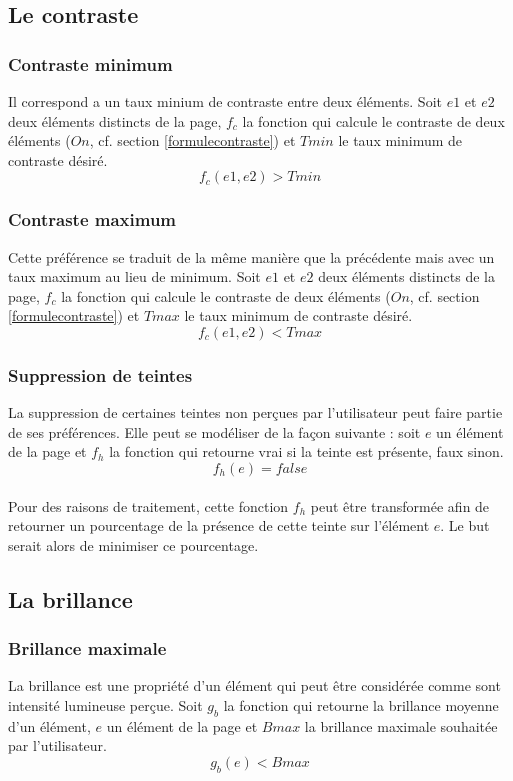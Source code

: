 \documentclass[french,a4paper]{report}
\begin{document}
{\subsection{Le contraste}
\subsubsection{Contraste minimum}
Il correspond a un taux minium de contraste entre deux éléments. Soit $e1$ et
$e2$ deux éléments distincts de la page, $f_c$ la fonction qui calcule le
contraste de deux éléments ($On$, cf. section \ref{formulecontraste}) et $Tmin$
le taux minimum de
contraste désiré.\\
$$f_{c}(e1,e2) > Tmin$$
\subsubsection{Contraste maximum}
Cette préférence se traduit de la même manière que la précédente mais avec un
taux maximum au lieu de minimum. Soit $e1$ et $e2$ deux éléments distincts de la
page, $f_c$ la fonction qui calcule le contraste de deux éléments ($On$,
cf. section \ref{formulecontraste}) et $Tmax$ le taux minimum de
contraste désiré.\\
$$f_{c}(e1,e2) < Tmax$$
\subsubsection{Suppression de teintes}
La suppression de certaines teintes non perçues par l'utilisateur peut faire
partie de ses préférences. Elle peut se modéliser de la façon suivante : soit $e$
un élément de la page et $f_h$ la fonction qui retourne vrai si la teinte est
présente, faux sinon.\\
$$f_h(e) = false$$\\
Pour des raisons de traitement, cette fonction $f_h$ peut être transformée afin
de retourner un pourcentage de la présence de cette teinte sur l'élément $e$. Le
but serait alors de minimiser ce pourcentage.
\subsection{La brillance}
\subsubsection{Brillance maximale}
La brillance est une propriété d'un élément qui peut être considérée comme sont
intensité lumineuse perçue. Soit $g_{b}$ la fonction qui retourne la brillance
moyenne d'un élément, $e$ un élément de la page et $Bmax$ la brillance maximale
souhaitée par l'utilisateur.
$$g_b(e) < Bmax$$
}
\end{document}
